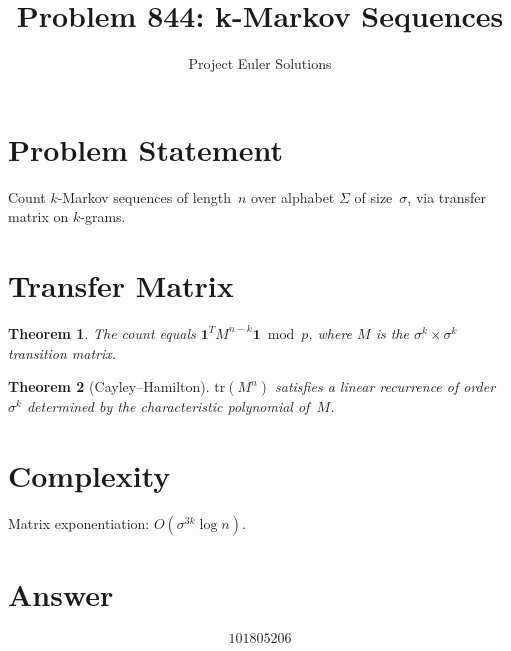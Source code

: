 \documentclass[11pt]{article}
\title{Problem 844: k-Markov Sequences}
\author{Project Euler Solutions}
\date{}
\newtheorem{theorem}{Theorem}
\begin{document}
\maketitle

\section{Problem Statement}
Count $k$-Markov sequences of length~$n$ over alphabet $\Sigma$ of size~$\sigma$, via transfer matrix on $k$-grams.

\section{Transfer Matrix}

\begin{theorem}
The count equals $\mathbf{1}^T M^{n-k} \mathbf{1} \bmod p$, where $M$ is the $\sigma^k \times \sigma^k$ transition matrix.
\end{theorem}

\begin{theorem}[Cayley--Hamilton]
$\mathrm{tr}(M^n)$ satisfies a linear recurrence of order~$\sigma^k$ determined by the characteristic polynomial of~$M$.
\end{theorem}

\section{Complexity}
Matrix exponentiation: $O(\sigma^{3k} \log n)$.

\section{Answer}

\[
\boxed{101805206}
\]
\end{document}
